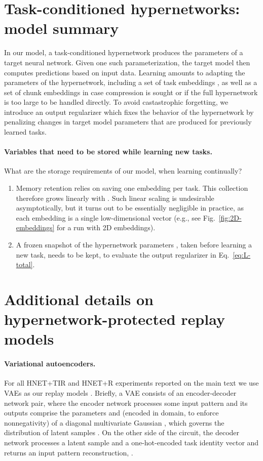 \documentclass{article}
\begin{document}
\section{Task-conditioned hypernetworks: model summary}
In our model, a task-conditioned hypernetwork produces the parameters  of a target neural network. Given one such parameterization, the target model then computes predictions  based on input data. Learning amounts to adapting the parameters  of the hypernetwork, including a set of task embeddings , as well as a set of chunk embeddings  in case compression is sought or if the full hypernetwork is too large to be handled directly. To avoid castastrophic forgetting, we introduce an output regularizer which fixes the behavior of the hypernetwork by penalizing changes in target model parameters that are produced for previously learned tasks. 

\paragraph{Variables that need to be stored while learning new tasks.} What are the storage requirements of our model, when learning continually?
\begin{enumerate}
  \item Memory retention relies on saving one embedding per task. This collection  therefore grows linearly with . Such linear scaling is undesirable asymptotically, but it turns out to be essentially negligible in practice, as each embedding is a single low-dimensional vector (e.g., see Fig.~\ref{fig:2D-embeddings} for a run with 2D embeddings). 
  \item A frozen snapshot of the hypernetwork parameters , taken before learning a new task, needs to be kept, to evaluate the output regularizer in Eq.~\ref{eq:L-total}.
\end{enumerate}

\section{Additional details on hypernetwork-protected replay models}
\label{apx:hypernetwork-replay}

\paragraph{Variational autoencoders.} For all HNET+TIR and HNET+R experiments reported on the main text we use VAEs as our replay models \citep[Fig.~\ref{fig:replay-setups}a,][]{kingma_auto-encoding_2014}. Briefly, a VAE consists of an encoder-decoder network pair, where the encoder network processes some input pattern  and its outputs  comprise the parameters  and  (encoded in  domain, to enforce nonnegativity) of a diagonal multivariate Gaussian , which governs the distribution of latent samples . On the other side of the circuit, the decoder network processes a latent sample  and a one-hot-encoded task identity vector and returns an input pattern reconstruction, .
\end{document}
